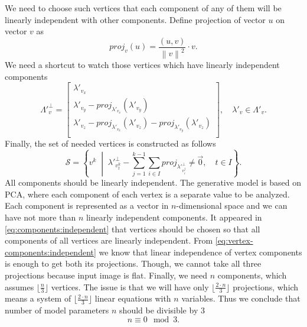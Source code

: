 We need to choose such vertices that each component of any of them
will be linearly independent with other components.
Define projection of vector $u$ on vector $v$ as
\begin{equation*}
  proj_v\left( u \right)
  = \frac{\left( u, v \right)}{\left\| v \right\|^2} \cdot v.
\end{equation*}
We need a shortcut to watch those vertices
which have linearly independent components
\begin{equation*}
  \Lambda'^{\perp}_v = \begin{bmatrix}
    \lambda'_{v_x} \\
    \lambda'_{v_y} - proj_{\lambda'_{v_x}}\left( \lambda'_{v_y} \right) \\
    \lambda'_{v_z} - proj_{\lambda'_{v_x}}\left( \lambda'_{v_z} \right)
                   - proj_{\lambda'_{v_y}}\left( \lambda'_{v_z} \right) \\
  \end{bmatrix},
  \quad \lambda'_v \in \Lambda'_v.
\end{equation*}
Finally, the set of needed vertices is constructed as follows
\begin{equation*}
  \mathcal{S}
  = \left\{ v^k \;\middle|\;
    \lambda'^{\perp}_{v^k_t}
    - \sum_{j = 1}^{k - 1} \sum_{i \in I}
    proj_{\lambda'^{\perp}_{v^j_i}} \neq \vec{0},
    \quad t \in I
  \right\}.
\end{equation*}
All components should be linearly independent.
The generative model is based on PCA,
where each component of each vertex is a separate value to be analyzed.
Each component is represented as a vector in $n$-dimensional space
and we can have not more than $n$ linearly independent components.
It appeared in \eqref{eq:components:independent}
that vertices should be chosen so that
all components of all vertices are linearly independent.
From \eqref{eq:vertex-components:independent} we know
that linear independence of vertex components
is enough to get both its projections.
Though, we cannot take all three projections because input image is flat.
Finally, we need $n$ components,
which assumes $\lfloor \frac{n}{3} \rfloor$ vertices.
The issue is that we will have only $\lfloor \frac{2 \cdot n}{3} \rfloor$
projections,
which means a system of $\lfloor \frac{2 \cdot n}{3} \rfloor$ linear equations
with $n$ variables.
Thus we conclude
that number of model parameters $n$ should be divisible by $3$
\begin{equation*}
  n \equiv 0 \mod 3.
\end{equation*}
